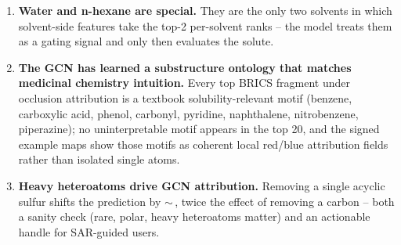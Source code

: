 \begin{enumerate}
        percentage points solute\(\to\)solvent -- the expected
        behaviour of a model that uses solvent identity as a coarse
        switch and solute identity as the regression target.
  \item \textbf{Water and n-hexane are special.}  They are the only
        two solvents in which solvent-side features take the top-2
        per-solvent ranks -- the model treats them as a gating signal
        and only then evaluates the solute.
  \item \textbf{The GCN has learned a substructure ontology that
        matches medicinal chemistry intuition.}  Every top BRICS
        fragment under occlusion attribution is a textbook
        solubility-relevant motif (benzene, carboxylic acid, phenol,
        carbonyl, pyridine, naphthalene, nitrobenzene, piperazine);
        no uninterpretable motif appears in the top 20, and the signed
        example maps show those motifs as coherent local red/blue
        attribution fields rather than isolated single atoms.
  \item \textbf{Heavy heteroatoms drive GCN attribution.}  Removing a
        single acyclic sulfur shifts the prediction by
        \(\sim\)\,\logS{}, twice the effect of removing
        a carbon -- both a sanity check (rare, polar, heavy
        heteroatoms matter) and an actionable handle for SAR-guided
        users.
\end{enumerate}

